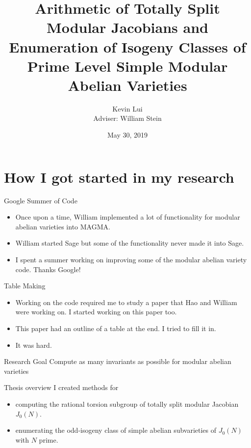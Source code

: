 \documentclass{beamer}
\title{%
    Arithmetic of Totally Split Modular Jacobians and Enumeration of Isogeny
    Classes of Prime Level Simple Modular Abelian Varieties
}
\author{Kevin Lui\\Adviser: William Stein}
\date{May 30, 2019}
\institute{Final Exam}
\begin{document}
\frame{\titlepage}

\section{How I got started in my research}

\begin{frame}{Google Summer of Code}
    \begin{itemize}
        \item 
            Once upon a time, William implemented a lot of functionality
            for modular abelian varieties into MAGMA.
        \item
            William started Sage but some of the functionality never made it
            into Sage.
        \item
            I spent a summer working on improving some of the modular abelian
            variety code. Thanks Google!
    \end{itemize} 
\end{frame}

\begin{frame}{Table Making}
    \begin{itemize}
        \item
            Working on the code required me to study a paper that Hao and
            William were working on. I started working on this paper too.
        \item
            This paper had an outline of a table at the end. I tried to fill it
            in.
        \item
            It was hard.
   \end{itemize} 
\end{frame}

\begin{frame}{Research Goal}
    \Huge{Compute as many invariants as possible for modular abelian
    varieties}
\end{frame}

\begin{frame}{Thesis overview}
    I created methods for
    \begin{itemize}
        \item
            computing the rational torsion subgroup of totally split modular
            Jacobian $J_0(N)$.
        \item
            enumerating the odd-isogeny class of simple abelian subvarieties of
            $J_0(N)$ with $N$ prime.
    \end{itemize}
\end{frame}
\end{document}
